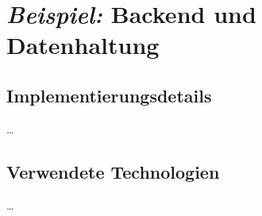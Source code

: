 
\section{\emph{Beispiel:} Backend und Datenhaltung\authorB}



\subsection{Implementierungsdetails}

\ldots

\subsection{Verwendete Technologien}

\ldots
